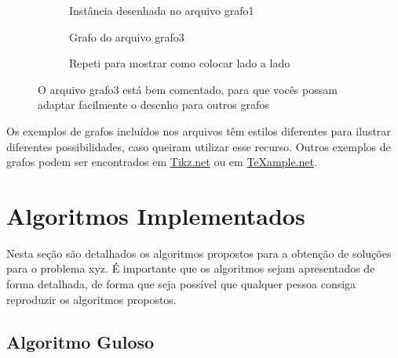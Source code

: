 \documentclass[12pt]{article}
\begin{document}
\begin{figure}[ht!]
  \centering
  
  \begin{subfigure}{0.95\textwidth}
    \centering
    
    \caption{Instância desenhada no arquivo grafo1 }
    \label{fig:grafo1}
  \end{subfigure}
  
\vspace{1cm} %
  \begin{subfigure}{0.45\textwidth}
    \centering
    \resizebox{0.9\textwidth}{!}{ 
    
    }
    \caption{Grafo do arquivo grafo3}
    \label{fig:grafo2}
  \end{subfigure}
  \hfill
  \begin{subfigure}{0.45\textwidth}
    \centering
    \resizebox{0.9\textwidth}{!}{
    
    }
    \caption{Repeti para mostrar como colocar lado a lado}
    \label{fig:grafo2-ladoalado}
  \end{subfigure}
  
  \caption{O arquivo grafo3 está bem comentado, para que vocês possam adaptar facilmente o desenho para outros grafos}
  \label{fig:acima}
\end{figure}

Os exemplos de grafos incluídos nos arquivos têm estilos diferentes para ilustrar diferentes possibilidades, caso queiram utilizar esse recurso. Outros exemplos de grafos podem ser encontrados em \href{https://tikz.net}{Tikz.net} ou em \href{https://texample.net}{TeXample.net}.



\section{Algoritmos Implementados}
\label{secAlgoritmos}

Nesta seção são detalhados os algoritmos propostos para a obtenção de soluções para o problema xyz.
É importante que os algoritmos sejam apresentados de forma detalhada, de forma que seja possível que qualquer pessoa consiga reproduzir os algoritmos propostos. 

\subsection{Algoritmo Guloso}
\label{subSecAlgGuloso}
\end{document}
